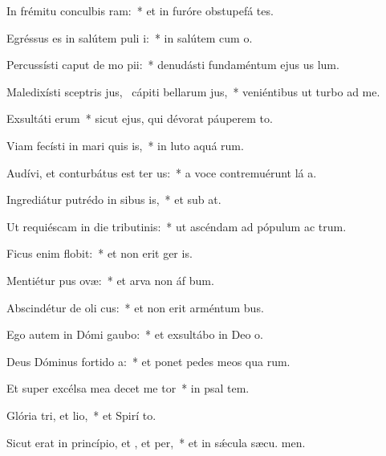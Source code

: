 \item In frémitu conculbis ram:~* et in furóre obstupefá tes.
\item Egréssus es in salútem puli i:~* in salútem cum  o.
\item Percussísti caput de mo pii:~* denudásti fundaméntum ejus us  lum.
\item Maledixísti sceptris jus,~\pscross{} cápiti bellarum jus,~* veniéntibus ut turbo ad  me.
\item Exsultáti erum~* sicut ejus, qui dévorat páuperem  to.
\item Viam fecísti in mari quis is,~* in luto aquá rum.
\item Audívi, et conturbátus est ter us:~* a voce contremuérunt lá a.
\item Ingrediátur putrédo in sibus is,~* et sub  at.
\item Ut requiéscam in die tributinis:~* ut ascéndam ad pópulum ac trum.
\item Ficus enim  flobit:~* et non erit ger  is.
\item Mentiétur pus ovæ:~* et arva non áf bum.
\item Abscindétur de oli cus:~* et non erit arméntum  bus.
\item Ego autem in Dómi gaubo:~* et exsultábo in Deo  o.
\item Deus Dóminus fortido a:~* et ponet pedes meos qua rum.
\item Et super excélsa mea decet me tor~* in psal tem.
\item Glória tri, et lio,~* et Spirí to.
\item Sicut erat in princípio, et , et per,~* et in sǽcula sæcu. men.
